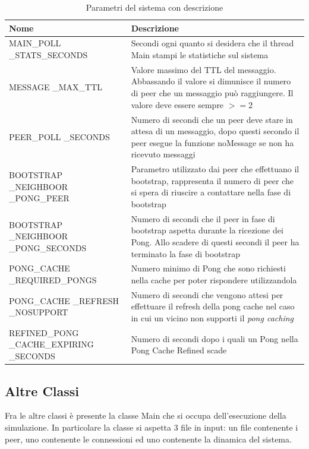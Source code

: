 \documentclass[a4paper,11pt]{article}
\begin{document}
\begin{table}
\centering
\begin{tabular}{|P{3.5cm}|P{10cm}|}
\hline
\textbf{Nome} & \textbf{Descrizione} \\
\hline
\textsf{MAIN\_POLL} \textsf{\_STATS\_SECONDS} & Secondi ogni quanto si desidera che il thread \textsf{Main} stampi le statistiche sul sistema \\
\hline
\textsf{MESSAGE} \textsf{\_MAX\_TTL} & Valore massimo del TTL del messaggio. Abbassando il valore si dimunisce il numero di peer che un messaggio pu\`o raggiungere. Il valore deve essere sempre $>= 2$  \\
\hline
\textsf{PEER\_POLL} \textsf{\_SECONDS} & Numero di secondi che un peer deve stare in attesa di un messaggio, dopo questi secondo il peer esegue la funzione \textsf{noMessage} se non ha ricevuto messaggi  \\
\hline
\textsf{BOOTSTRAP} \textsf{\_NEIGHBOOR} \textsf{\_PONG\_PEER} & Parametro utilizzato dai peer che effettuano il bootstrap, rappresenta il numero di peer che si spera di riuscire a contattare nella fase di bootstrap  \\
\hline
\textsf{BOOTSTRAP} \textsf{\_NEIGHBOOR} \textsf{\_PONG\_SECONDS} & Numero di secondi che il peer in fase di bootstrap aspetta durante la ricezione dei Pong. Allo scadere di questi secondi il peer ha terminato la fase di bootstrap  \\
\hline
\textsf{PONG\_CACHE} \textsf{\_REQUIRED\_PONGS} & Numero minimo di Pong che sono richiesti nella cache per poter rispondere utilizzandola  \\
\hline
\textsf{PONG\_CACHE} \textsf{\_REFRESH} \textsf{\_NOSUPPORT} & Numero di secondi che vengono attesi per effettuare il refresh della pong cache nel caso in cui un vicino non supporti il \emph{pong caching}  \\
\hline
\textsf{REFINED\_PONG} \textsf{\_CACHE\_EXPIRING} \textsf{\_SECONDS} & Numero di secondi dopo i quali un Pong nella Pong Cache Refined scade  \\
\hline
\end{tabular}
\caption{Parametri del sistema con descrizione}
\label{tab:par}
\end{table}


\subsection{Altre Classi}

Fra le altre classi \`e presente la classe \textsf{Main} che si occupa dell'esecuzione della simulazione. In particolare la classe si aspetta 3 file in input: un file contenente i peer, uno contenente le connessioni ed uno contenente la dinamica del sistema.
\end{document}
